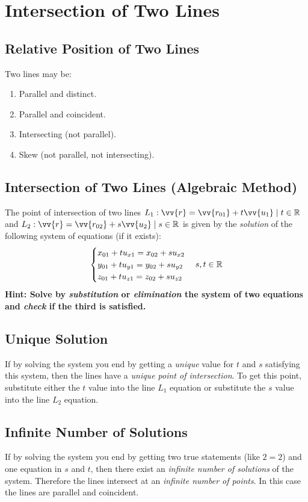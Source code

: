 \section{Intersection of Two Lines}
\subsection{Relative Position of Two Lines}
	Two lines may be:
	\begin{enumerate}
		\item Parallel and distinct.
		\item Parallel and coincident.
		\item Intersecting (not parallel).
		\item Skew (not parallel, not intersecting).
	\end{enumerate}
\subsection{Intersection of Two Lines (Algebraic Method)}
	The point of intersection of two lines $L_1: \vv{r} = \vv{r_{01}} + t\vv{u_1} \such t \in \real$ and $L_2: \vv{r} = \vv{r_{02}} + s\vv{u_2} \such s \in \real$ is given by the \emph{solution} of the following system of equations (if it exists):
	\begin{equation*}
		\begin{cases}
			x_{01} + tu_{x1} = x_{02} + su_{x2}\\
			y_{01} + tu_{y1} = y_{02} + su_{y2}\\
			z_{01} + tu_{z1} = z_{02} + su_{z2}
		\end{cases}
		s, t \in \mathbb{R}
	\end{equation*}
	\textbf{Hint: Solve by \emph{substitution} or \emph{elimination} the system of two equations and \emph{check} if the third is satisfied.}
\subsection{Unique Solution}
	If by solving the system you end by getting a \emph{unique} value for $t$ and $s$ satisfying this system, then the lines have a \emph{unique point of intersection}.
	To get this point, substitute either the $t$ value into the line $L_1$ equation or substitute the $s$ value into the line $L_2$ equation.
\subsection{Infinite Number of Solutions}
	If by solving the system you end by getting two true statements (like $2=2$) and one equation in $s$ and $t$, then there exist an \emph{infinite number of solutions} of the system.
	Therefore the lines intersect at an \emph{infinite number of points}. 
	In this case the lines are parallel and coincident.
